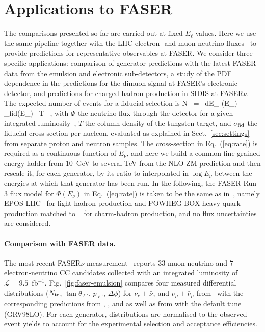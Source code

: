 \section{Applications to FASER}
\label{sec:faser-app}
\label{sec:rates}

The comparisons presented so far are carried out at fixed $E_\ell$ values.
%
Here we use the same pipeline together with the LHC electron- and muon-neutrino fluxes~\cite{FASER:2024ykc} to provide predictions for representative observables at FASER.
%
We consider three specific applications: comparison of generator predictions with the latest FASER data from the emulsion and electronic sub-detectors, a study of the PDF dependence in the predictions for the dimuon signal at FASER's electronic detector, and predictions for charged-hadron production in SIDIS at FASER$\nu$. 
%
The expected number of events for a fiducial selection is 
\be
  N \, = \, \int dE_\nu \; \Phi(E_\nu) \, \sigma_{\rm fid}(E_\nu) \, T \, ,
  \label{eq:rate}
\ee
with $\Phi$ the neutrino flux through the detector for a given integrated luminosity~\cite{Kling:2021gos}, $T$ the column density of the tungsten target, and $\sigma_{\rm fid}$ the fiducial cross-section per nucleon, evaluated as explained in Sect.~\ref{sec:settings} from separate proton and neutron samples.
%
The cross-section in Eq.~(\ref{eq:rate}) is required as a continuous function of $E_\nu$, and
here we build a common fine-grained energy ladder from $10$~GeV to several TeV from the \yadism NLO ZM prediction and then rescale it, for each generator, by its ratio to \yadism interpolated in $\log E_\nu$ between the energies at which that generator has been run.
%
In the following, the FASER Run 3 flux model for $\Phi(E_\nu)$ in Eq.~(\ref{eq:rate}) is taken to be the same as in~\cite{FASER:2024ykc}, namely {\sc\small EPOS-LHC}~\cite{Pierog:2013ria} for light-hadron production and POWHEG-BOX heavy-quark production matched to \pythia~\cite{Buonocore:2023kna} for charm-hadron production, and no flux uncertainties are considered. 

\paragraph{Comparison with FASER data.}
%
The most recent FASER$\nu$ measurement~\cite{FASERnu:2026conf} reports $33$ muon-neutrino and $7$ electron-neutrino CC candidates collected with an integrated luminosity of $\mathcal{L}=9.5$~fb$^{-1}$.
%
Fig.~\ref{fig:faser-emulsion} compares four measured differential distributions ($N_{\mathrm{tr}}$, $\tan \theta_{\ell'}$, $p_{\ell'}$, $\Delta \phi$) for $\nu_e+\bar{\nu}_e$  and $\nu_\mu+\bar{\nu}_\mu$ from~\cite{FASERnu:2026conf} with the corresponding predictions from \powhegtwo, \sherpa, and \herwig as well as from \genie with the default tune (GRV98LO).
%
For each generator, distributions are normalised to the observed event yields to account for the experimental selection and acceptance efficiencies. 


